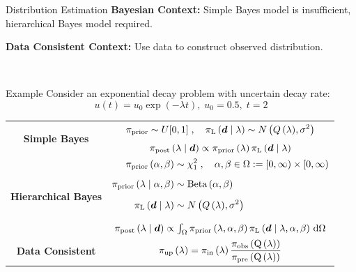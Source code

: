 \begin{block}{Distribution Estimation}
\centering
            {\large \textbf{Bayesian Context:} Simple Bayes model is insufficient, hierarchical Bayes model required.}
           
           {\large \textbf{Data Consistent Context:} Use data to construct observed distribution.}
           
           {\large \ }

             
\end{block}


\begin{block}{Example}
\centering
Consider an exponential decay problem with uncertain decay rate:
\begin{equation*}
       u(t) = u_0\exp(-\lambda t), \; u_0 = 0.5 ,\; t=2
   \end{equation*}

\begin{tabular}{c|c}
\hline
\multirow{2}{*}{\vspace{1.5ex}\textbf{Simple Bayes}} & 
$\begin{aligned}\prior \sim U[0,1]\; , \quad  \likelihood\qGivelam\sim N\left(Q\lam,\sigma^2\right) \end{aligned}$ \\[1.25ex]
                                        & $\bayes$ \\
\hline
\multirow{2}{*}{\vspace{2ex} \textbf{Hierarchical Bayes}}   & $\begin{aligned}
        \prior\hyper &\sim \chi^2_1\; , \quad \alpha,\beta\in\Omega:=[0,\infty)\times[0,\infty) \\[1.25ex]
        \prior\lamGiveH &\sim \text{Beta}\hyper \\[1.25ex]
        \likelihood\qGivelam &\sim N\left(Q\lam,\sigma^2\right)\\[1.25ex] \end{aligned}$ \\[1.25ex]
                                    & $\Hbayes$ \\
\hline
\textbf{Data Consistent} &  $\dci$ \\
\hline
\end{tabular}
\vspace{1cm}


\end{block}
